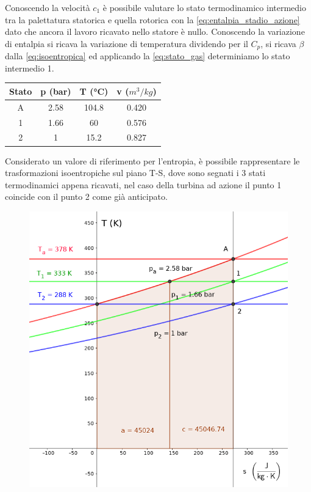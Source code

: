 \documentclass[a4paper,12pt]{article}
\begin{document}
Conoscendo la velocità $c_1$ è possibile valutare lo stato termodinamico intermedio tra la palettatura statorica e quella rotorica con la \eqref{eq:entalpia_stadio_azione}
dato che ancora il lavoro ricavato nello statore è nullo.
Conoscendo la variazione di entalpia si ricava la variazione di temperatura dividendo per il $C_p$, si ricava $\beta$ dalla \eqref{eq:isoentropica}
ed applicando la \eqref{eq:stato_gas} determiniamo lo stato intermedio 1.

\begin{center}
    \begin{tabular}{c|c|c|c}
        Stato   &p (bar)    &T (°C) &v ($m^3/kg$) \\ \hline
        A       &2.58       &104.8  &0.420  \\
        1       &1.66       &60     &0.576  \\
        2       &1          &15.2   &0.827  
    \end{tabular}
\end{center}

Considerato un valore di riferimento per l'entropia, è possibile rappresentare le trasformazioni isoentropiche sul piano T-S, dove sono segnati i 3 stati termodinamici
appena ricavati, nel caso della turbina ad azione il punto 1 coincide con il punto 2 come già anticipato.
\begin{figure}[H]
    \label{fig:trasformazioni_TS}
    \centering
    \includegraphics[width=.55\linewidth]{media/trasformazioni_TS.png}
\end{figure}
\end{document}
